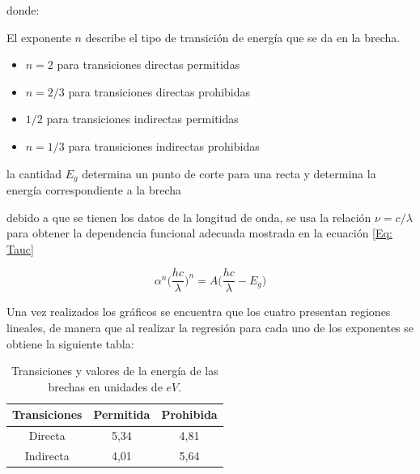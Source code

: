 \documentclass[article]{article}
\begin{document}
\begin{multicols}{2}
        donde: 
        
        El exponente $n$ describe el tipo de transición de energía que se da en la brecha.
        
        \begin{itemize}
            \item $n=2$ para transiciones directas permitidas
            \item $n=2/3$ para transiciones directas prohibidas
            \item $1/2$ para transiciones indirectas permitidas
            \item $n=1/3$ para transiciones indirectas prohibidas 
        \end{itemize}
        
        la cantidad $E_g$ determina un punto de corte para una recta y determina la energía correspondiente a la brecha
        
        debido a que se tienen los datos de la longitud de onda, se usa la relación $\nu=c/\lambda$ para obtener la dependencia funcional adecuada mostrada en la ecuación \ref{Eq: Tauc}
        
        \begin{equation}
            \alpha^n\Big( \frac{hc}{\lambda}\Big)^n=A\Big(\frac{hc}{\lambda}-E_g\Big)
            \label{Eq: Tauc}
        \end{equation}
        
        Una vez realizados los gráficos se encuentra que los cuatro presentan regiones lineales, de manera que al realizar la regresión para cada uno de los exponentes se obtiene la siguiente tabla:
        
        \begin{table}[H]
            \centering
            \begin{tabular}{|c|c|c|}
            \hline
            Transiciones & Permitida & Prohibida \\ 
            \hline
            Directa & 5,34 & 4,81  \\     
            \hline
            Indirecta & 4,01 & 5,64  \\ \hline
            \end{tabular}
            \label{Tab: Gap values and transitions}
            \caption{Transiciones y valores de la energía de las brechas en unidades de $eV$.}
        \end{table}
        \end{multicols}
        \newpage
        
\end{document}
